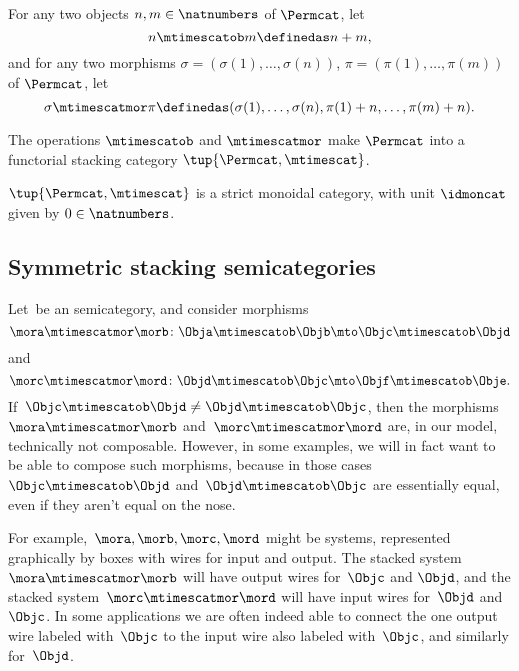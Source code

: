 \begin{definition}
For any two objects $n, m \in \natnumbers$ of $\Permcat$, let 
\begin{equation}
n \mtimescatob m \definedas n + m, 
\end{equation}
and for any two morphisms $\sigma = (\sigma(1), \dots, \sigma(n))$, $\pi =  (\pi(1), \dots, \pi(m))$ of $\Permcat$, let
\begin{equation}
\sigma \mtimescatmor \pi \definedas (\sigma(1), \dots, \sigma(n), \pi(1) + n, \dots, \pi(m) + n). 
\end{equation}
\end{definition}

\begin{lemma}
The operations $\mtimescatob$ and $\mtimescatmor$ make $\Permcat$ into a functorial stacking category $\tup{\Permcat, \mtimescat}$. 
\end{lemma}

\begin{lemma}
$\tup{\Permcat, \mtimescat}$ is a strict monoidal category, with unit $\idmoncat$ given by $0 \in \natnumbers$.
\end{lemma}


\subsection{Symmetric stacking semicategories}

Let~\CatC be an  semicategory, and consider morphisms
\begin{equation}
    \mora \mtimescatmor \morb \colon \Obja \mtimescatob \Objb \mto \Objc \mtimescatob \Objd
\end{equation}
and
\begin{equation}
    \morc \mtimescatmor \mord \colon \Objd \mtimescatob \Objc \mto \Objf \mtimescatob \Obje.
\end{equation}
If~$\Objc \mtimescatob \Objd \neq \Objd \mtimescatob \Objc$, then the morphisms~$\mora \mtimescatmor \morb$ and~$\morc \mtimescatmor \mord$ are, in our model, technically not composable.
However, in some examples, we will in fact want to be able to compose such morphisms, because in those cases~$\Objc \mtimescatob \Objd$ and~$\Objd \mtimescatob \Objc$ are essentially equal, even if they aren't equal on the nose.

For example,~$\mora, \morb, \morc, \mord$ might be systems, represented graphically by boxes with wires for input and output.
The stacked system~$\mora \mtimescatmor \morb$ will have output wires for~$\Objc$ and $\Objd$, and the stacked system~$\morc \mtimescatmor \mord$ will have input wires for~$\Objd$ and~$\Objc$.
In some applications we are often indeed able to connect the one output wire labeled with~$\Objc$ to the input wire also labeled with~$\Objc$, and similarly for~$\Objd$.

